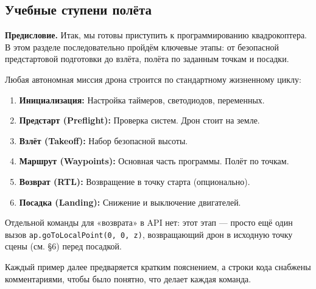 \subsection{Учебные ступени полёта}

\textbf{Предисловие.} Итак, мы готовы приступить к программированию квадрокоптера. В этом разделе последовательно пройдём ключевые этапы: от безопасной предстартовой подготовки до взлёта, полёта по заданным точкам и посадки.

Любая автономная миссия дрона строится по стандартному жизненному циклу:

\begin{infobox}
\begin{enumerate}
    \item \textbf{Инициализация:} Настройка таймеров, светодиодов, переменных.
    \item \textbf{Предстарт (Preflight):} Проверка систем. Дрон стоит на земле.
    \item \textbf{Взлёт (Takeoff):} Набор безопасной высоты.
    \item \textbf{Маршрут (Waypoints):} Основная часть программы. Полёт по точкам.
    \item \textbf{Возврат (RTL):} Возвращение в точку старта (опционально).
    \item \textbf{Посадка (Landing):} Снижение и выключение двигателей.
\end{enumerate}
\end{infobox}

Отдельной команды для «возврата» в API нет: этот этап — просто ещё один вызов \texttt{ap.goToLocalPoint(0, 0, z)}, возвращающий дрон в исходную точку сцены (см. §6) перед посадкой.

Каждый пример далее предваряется кратким пояснением, а строки кода снабжены комментариями, чтобы было понятно, что делает каждая команда.
